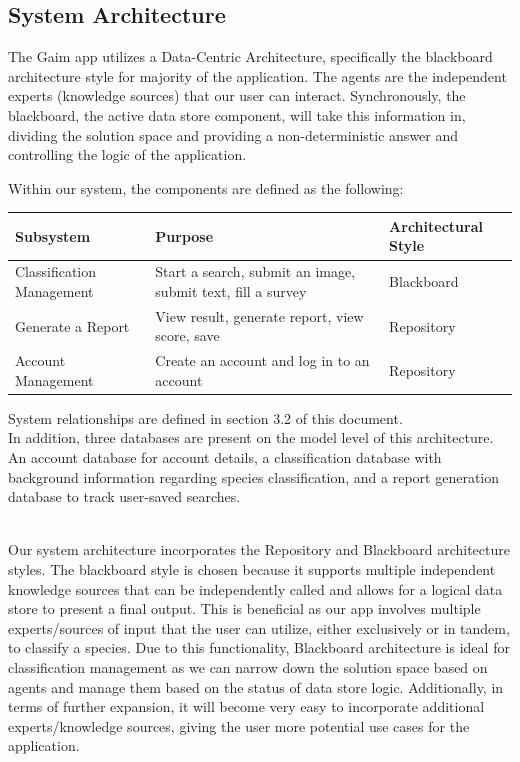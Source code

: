 \documentclass[]{article}
\begin{document}
\subsection{System Architecture}
\label{sub:system_architecture}
The Gaim app utilizes a Data-Centric Architecture, specifically the blackboard architecture style for majority of the application. The agents are the independent experts (knowledge sources) that our user can interact. Synchronously, the blackboard, the active data store component, will take this information in, dividing the solution space and providing a non-deterministic answer and controlling the logic of the application.
\\
\begin{table}[h]
Within our system, the components are defined as the following:  
    \centering
    \renewcommand{\arraystretch}{1.3}
    \begin{tabular}{| m{5cm} | m{6cm} | m{4cm} |}
        \hline
        \textbf{Subsystem} & \textbf{Purpose} & \textbf{Architectural Style} \\
        \hline
        Classification Management & Start a search, submit an image, submit text, fill a survey & Blackboard \\
        \hline
        Generate a Report & View result, generate report, view score, save & Repository \\
        \hline
        Account Management & Create an account and log in to an account & Repository \\
        \hline
    \end{tabular}
\end{table}

System relationships are defined in section 3.2 of this document. 
\\

In addition, three databases are present on the model level of this architecture. An account database for account details, a classification database with background information regarding species classification, and a report generation database to track user-saved searches. 

\\

Our system architecture incorporates the Repository and Blackboard architecture styles. The blackboard style is chosen because it supports multiple independent knowledge sources that can be independently called and allows for a logical data store to present a final output. This is beneficial as our app involves multiple experts/sources of input that the user can utilize, either exclusively or in tandem, to classify a species. Due to this functionality, Blackboard architecture is ideal for classification management as we can narrow down the solution space based on agents and manage them based on the status of data store logic. Additionally, in terms of further expansion, it will become very easy to incorporate additional experts/knowledge sources, giving the user more potential use cases for the application.
\end{document}
